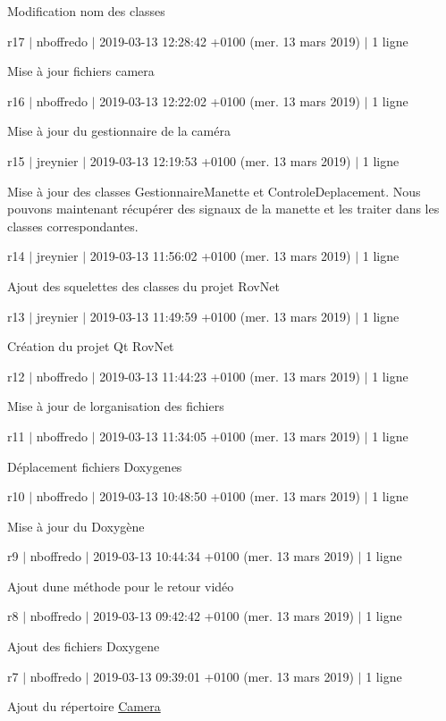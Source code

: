 Modification nom des classes

r17 $\vert$ nboffredo $\vert$ 2019-\/03-\/13 12\+:28\+:42 +0100 (mer. 13 mars 2019) $\vert$ 1 ligne

Mise à jour fichiers camera

r16 $\vert$ nboffredo $\vert$ 2019-\/03-\/13 12\+:22\+:02 +0100 (mer. 13 mars 2019) $\vert$ 1 ligne

Mise à jour du gestionnaire de la caméra

r15 $\vert$ jreynier $\vert$ 2019-\/03-\/13 12\+:19\+:53 +0100 (mer. 13 mars 2019) $\vert$ 1 ligne

Mise à jour des classes Gestionnaire\+Manette et Controle\+Deplacement. Nous pouvons maintenant récupérer des signaux de la manette et les traiter dans les classes correspondantes.

r14 $\vert$ jreynier $\vert$ 2019-\/03-\/13 11\+:56\+:02 +0100 (mer. 13 mars 2019) $\vert$ 1 ligne

Ajout des squelettes des classes du projet Rov\+Net

r13 $\vert$ jreynier $\vert$ 2019-\/03-\/13 11\+:49\+:59 +0100 (mer. 13 mars 2019) $\vert$ 1 ligne

Création du projet Qt Rov\+Net

r12 $\vert$ nboffredo $\vert$ 2019-\/03-\/13 11\+:44\+:23 +0100 (mer. 13 mars 2019) $\vert$ 1 ligne

Mise à jour de l\textquotesingle{}organisation des fichiers

r11 $\vert$ nboffredo $\vert$ 2019-\/03-\/13 11\+:34\+:05 +0100 (mer. 13 mars 2019) $\vert$ 1 ligne

Déplacement fichiers Doxygenes

r10 $\vert$ nboffredo $\vert$ 2019-\/03-\/13 10\+:48\+:50 +0100 (mer. 13 mars 2019) $\vert$ 1 ligne

Mise à jour du Doxygène

r9 $\vert$ nboffredo $\vert$ 2019-\/03-\/13 10\+:44\+:34 +0100 (mer. 13 mars 2019) $\vert$ 1 ligne

Ajout d\textquotesingle{}une méthode pour le retour vidéo

r8 $\vert$ nboffredo $\vert$ 2019-\/03-\/13 09\+:42\+:42 +0100 (mer. 13 mars 2019) $\vert$ 1 ligne

Ajout des fichiers Doxygene

r7 $\vert$ nboffredo $\vert$ 2019-\/03-\/13 09\+:39\+:01 +0100 (mer. 13 mars 2019) $\vert$ 1 ligne

Ajout du répertoire \hyperlink{class_camera}{Camera}

